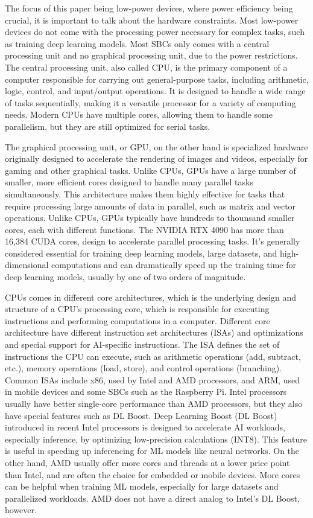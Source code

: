 \documentclass[12pt]{article}
\begin{document}
The focus of this paper being low-power devices, where power efficiency being crucial, it is important to talk about the hardware constraints. Most low-power devices do not come with the processing power necessary for complex tasks, such as training deep learning models. Most SBCs only comes with a central processing unit and no graphical processing unit, due to the power restrictions.
The central processing unit, also called CPU, is the primary component of a computer responsible for carrying out general-purpose tasks, including arithmetic, logic, control, and input/output operations. It is designed to handle a wide range of tasks sequentially, making it a versatile processor for a variety of computing needs. Modern CPUs have multiple cores, allowing them to handle some parallelism, but they are still optimized for serial tasks.

The graphical processing unit, or GPU, on the other hand is specialized hardware originally designed to accelerate the rendering of images and videos, especially for gaming and other graphical tasks. Unlike CPUs, GPUs have a large number of smaller, more efficient cores designed to handle many parallel tasks simultaneously. This architecture makes them highly effective for tasks that require processing large amounts of data in parallel, such as matrix and vector operations. Unlike CPUs, GPUs typically have hundreds to thounsand smaller cores, each with different functions. The NVIDIA RTX 4090 has more than 16,384 CUDA cores, design to accelerate parallel processing tasks. It's generally considered essential for training deep learning models, large datasets, and high-dimensional computations and can dramatically speed up the training time for deep learning models, usually by one of two orders of magnitude.

CPUs comes in different core architectures, which is the underlying design and structure of a CPU's processing core, which is responsible for executing instructions and performing computations in a computer. Different core architecture have different instruction set architectures (ISAs) and optimizations and special support for AI-specific instructions. The ISA defines the set of instructions the CPU can execute, such as arithmetic operations (add, subtract, etc.), memory operations (load, store), and control operations (branching). Common ISAs include x86, used by Intel and AMD processors, and ARM, used in mobile devices and some SBCs such as the Raspberry Pi.
Intel processors usually have better single-core performance than AMD processors, but they also have special features such as DL Boost. Deep Learning Boost (DL Boost) introduced in recent Intel processors is designed to accelerate AI workloads, especially inference, by optimizing low-precision calculations (INT8). This feature is useful in speeding up inferencing for ML models like neural networks.
On the other hand, AMD usually offer more cores and threads at a lower price point than Intel, and are often the choice for embedded or mobile devices. More cores can be helpful when training ML models, especially for large datasets and parallelized workloads. AMD does not have a direct analog to Intel's DL Boost, however.
\end{document}
